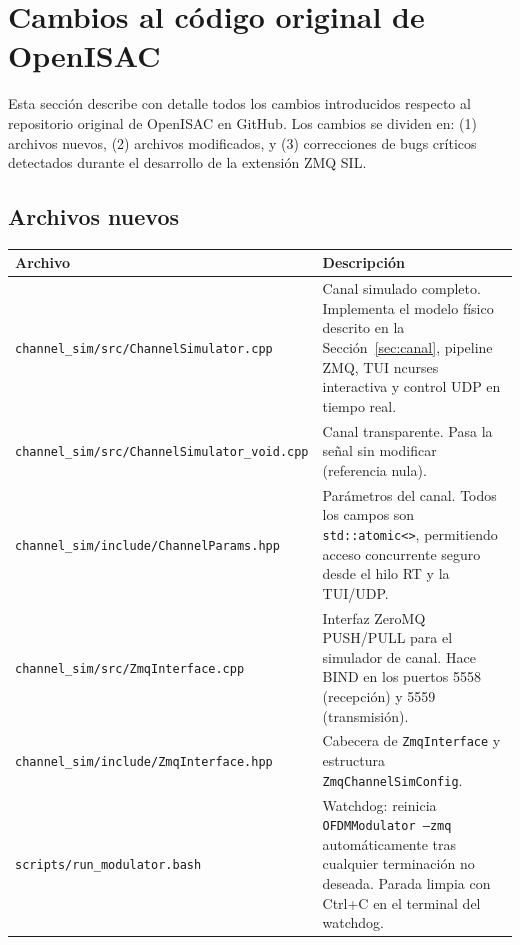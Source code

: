 \documentclass[11pt,a4paper]{article}
\begin{document}
\section{Cambios al código original de OpenISAC}
\label{sec:cambios}

Esta sección describe con detalle todos los cambios introducidos respecto al
repositorio original de OpenISAC en GitHub. Los cambios se dividen en:
(1) archivos nuevos, (2) archivos modificados, y (3) correcciones de bugs críticos
detectados durante el desarrollo de la extensión ZMQ SIL.

\subsection{Archivos nuevos}

{\small
\begin{tabularx}{\linewidth}{p{5.4cm}X}
\toprule
\textbf{Archivo} & \textbf{Descripción} \\
\midrule
\texttt{channel\_sim/src/}\newline\texttt{ChannelSimulator.cpp} &
  Canal simulado completo. Implementa el modelo físico descrito en la Sección~\ref{sec:canal},
  pipeline ZMQ, TUI ncurses interactiva y control UDP en tiempo real. \\
\addlinespace
\texttt{channel\_sim/src/}\newline\texttt{ChannelSimulator\_void.cpp} &
  Canal transparente. Pasa la señal sin modificar (referencia nula). \\
\addlinespace
\texttt{channel\_sim/include/}\newline\texttt{ChannelParams.hpp} &
  Parámetros del canal. Todos los campos son \texttt{std::atomic<>},
  permitiendo acceso concurrente seguro desde el hilo RT y la TUI/UDP. \\
\addlinespace
\texttt{channel\_sim/src/}\newline\texttt{ZmqInterface.cpp} &
  Interfaz ZeroMQ PUSH/PULL para el simulador de canal.
  Hace BIND en los puertos 5558 (recepción) y 5559 (transmisión). \\
\addlinespace
\texttt{channel\_sim/include/}\newline\texttt{ZmqInterface.hpp} &
  Cabecera de \texttt{ZmqInterface} y estructura \texttt{ZmqChannelSimConfig}. \\
\addlinespace
\texttt{scripts/run\_modulator.bash} &
  Watchdog: reinicia \texttt{OFDMModulator --zmq} automáticamente tras cualquier
  terminación no deseada. Parada limpia con Ctrl+C en el terminal
  del watchdog. \\
\bottomrule
\end{tabularx}
}
\end{document}
